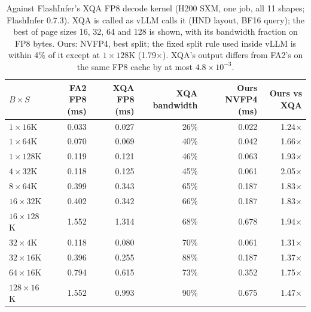 \documentclass[11pt]{article}
\begin{document}
\begin{table}[tbp]
\centering
\caption{Against FlashInfer's XQA FP8 decode kernel (H200 SXM, one job, all 11 shapes; FlashInfer 0.7.3). XQA is called as vLLM calls it (HND layout, BF16 query); the best of page sizes 16, 32, 64 and 128 is shown, with its bandwidth fraction on FP8 bytes. Ours: NVFP4, best split; the fixed split rule used inside vLLM is within 4\% of it except at $1 \times 128$K (1.79$\times$). XQA's output differs from FA2's on the same FP8 cache by at most $4.8\times10^{-3}$.}
\label{tab:xqa}
\small
\begin{tabular}{@{}lrrrrr@{}}
\toprule
$B \times S$ & FA2 FP8 (ms) & XQA FP8 (ms) & XQA bandwidth & Ours NVFP4 (ms) & Ours vs XQA \\
\midrule
$1 \times 16$K   & 0.033 & 0.027 & 26\% & 0.022 & 1.24$\times$ \\
$1 \times 64$K   & 0.070 & 0.069 & 40\% & 0.042 & 1.66$\times$ \\
$1 \times 128$K  & 0.119 & 0.121 & 46\% & 0.063 & 1.93$\times$ \\
$4 \times 32$K   & 0.118 & 0.125 & 45\% & 0.061 & 2.05$\times$ \\
$8 \times 64$K   & 0.399 & 0.343 & 65\% & 0.187 & 1.83$\times$ \\
$16 \times 32$K  & 0.402 & 0.342 & 66\% & 0.187 & 1.83$\times$ \\
$16 \times 128$K & 1.552 & 1.314 & 68\% & 0.678 & 1.94$\times$ \\
$32 \times 4$K   & 0.118 & 0.080 & 70\% & 0.061 & 1.31$\times$ \\
$32 \times 16$K  & 0.396 & 0.255 & 88\% & 0.187 & 1.37$\times$ \\
$64 \times 16$K  & 0.794 & 0.615 & 73\% & 0.352 & 1.75$\times$ \\
$128 \times 16$K & 1.552 & 0.993 & 90\% & 0.675 & 1.47$\times$ \\
\bottomrule
\end{tabular}
\end{table}
\end{document}
